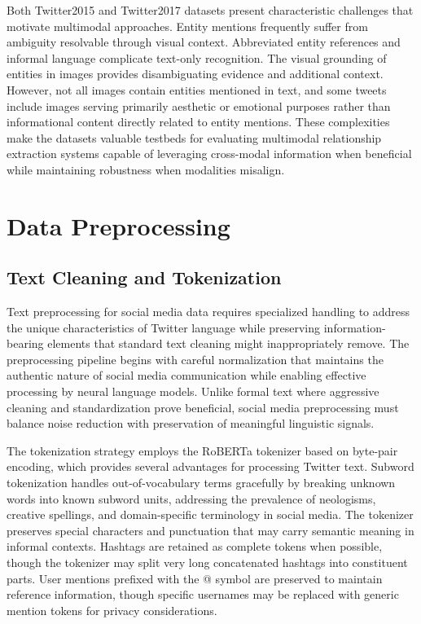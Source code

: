 \documentclass[12pt,a4paper]{report}
\begin{document}
Both Twitter2015 and Twitter2017 datasets present characteristic challenges that motivate multimodal approaches. Entity mentions frequently suffer from ambiguity resolvable through visual context. Abbreviated entity references and informal language complicate text-only recognition. The visual grounding of entities in images provides disambiguating evidence and additional context. However, not all images contain entities mentioned in text, and some tweets include images serving primarily aesthetic or emotional purposes rather than informational content directly related to entity mentions. These complexities make the datasets valuable testbeds for evaluating multimodal relationship extraction systems capable of leveraging cross-modal information when beneficial while maintaining robustness when modalities misalign.

\section{Data Preprocessing}

\subsection{Text Cleaning and Tokenization}

Text preprocessing for social media data requires specialized handling to address the unique characteristics of Twitter language while preserving information-bearing elements that standard text cleaning might inappropriately remove. The preprocessing pipeline begins with careful normalization that maintains the authentic nature of social media communication while enabling effective processing by neural language models. Unlike formal text where aggressive cleaning and standardization prove beneficial, social media preprocessing must balance noise reduction with preservation of meaningful linguistic signals.

The tokenization strategy employs the RoBERTa tokenizer based on byte-pair encoding, which provides several advantages for processing Twitter text. Subword tokenization handles out-of-vocabulary terms gracefully by breaking unknown words into known subword units, addressing the prevalence of neologisms, creative spellings, and domain-specific terminology in social media. The tokenizer preserves special characters and punctuation that may carry semantic meaning in informal contexts. Hashtags are retained as complete tokens when possible, though the tokenizer may split very long concatenated hashtags into constituent parts. User mentions prefixed with the @ symbol are preserved to maintain reference information, though specific usernames may be replaced with generic mention tokens for privacy considerations.
\end{document}
